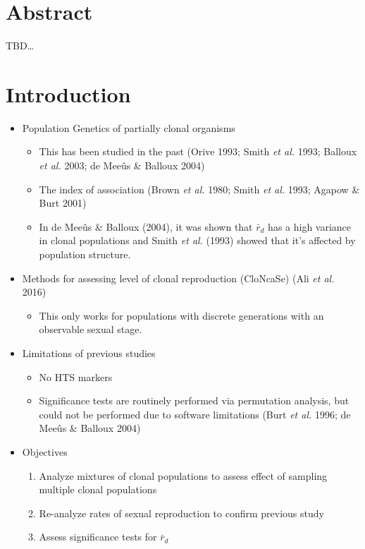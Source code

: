\documentclass[double,12pt]{beavtex}
\providecommand{\tightlist}{%
  \setlength{\itemsep}{0pt}\setlength{\parskip}{0pt}}
\begin{document}
  \section{Abstract}\label{abstract-4}
  
  TBD\ldots{}
  
  \section{Introduction}\label{introduction-4}
  
  \begin{itemize}
  \tightlist
  \item
    Population Genetics of partially clonal organisms
  
    \begin{itemize}
    \tightlist
    \item
      This has been studied in the past (Orive 1993; Smith \emph{et al.}
      1993; Balloux \emph{et al.} 2003; de Meeûs \& Balloux 2004)
    \item
      The index of association (Brown \emph{et al.} 1980; Smith \emph{et
      al.} 1993; Agapow \& Burt 2001)
    \item
      In de Meeûs \& Balloux (2004), it was shown that \(\bar{r}_d\) has a
      high variance in clonal populations and Smith \emph{et al.} (1993)
      showed that it's affected by population structure.
    \end{itemize}
  \item
    Methods for assessing level of clonal reproduction (CloNcaSe) (Ali
    \emph{et al.} 2016)
  
    \begin{itemize}
    \tightlist
    \item
      This only works for populations with discrete generations with an
      observable sexual stage.
    \end{itemize}
  \item
    Limitations of previous studies
  
    \begin{itemize}
    \tightlist
    \item
      No HTS markers
    \item
      Significance tests are routinely performed via permutation analysis,
      but could not be performed due to software limitations (Burt
      \emph{et al.} 1996; de Meeûs \& Balloux 2004)
    \end{itemize}
  \item
    Objectives
  
    \begin{enumerate}
    \def\labelenumi{\arabic{enumi}.}
    \tightlist
    \item
      Analyze mixtures of clonal populations to assess effect of sampling
      multiple clonal populations
    \item
      Re-analyze rates of sexual reproduction to confirm previous study
    \item
      Assess significance tests for \(\bar{r}_d\)
    \end{enumerate}
  \end{itemize}
  
\end{document}
